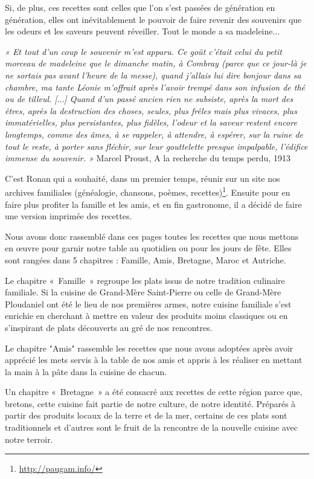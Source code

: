 Si, de plus, ces recettes sont celles que l’on s’est passées de génération en génération, elles ont inévitablement le pouvoir de faire revenir des souvenirs que les odeurs et les saveurs peuvent réveiller. Tout le monde a sa madeleine$\ldots$

\textit{« Et tout d'un coup le souvenir m'est apparu. Ce goût c'était celui du petit morceau de madeleine que le dimanche matin, à Combray (parce que ce jour-là je ne sortais pas avant l'heure de la messe), quand j'allais lui dire bonjour dans sa chambre, ma tante Léonie m'offrait après l'avoir trempé dans son infusion de thé ou de tilleul. [$\ldots$] Quand d'un passé ancien rien ne subsiste, après la mort des êtres, après la destruction des choses, seules, plus frêles mais plus vivaces, plus immatérielles, plus persistantes, plus fidèles, l'odeur et la saveur restent encore longtemps, comme des âmes, à se rappeler, à attendre, à espérer, sur la ruine de tout le reste, à porter sans fléchir, sur leur gouttelette presque impalpable, l'édifice immense du souvenir. »} Marcel Proust, A la recherche du temps perdu, 1913

C’est Ronan qui a souhaité, dans un premier temps, réunir sur un site nos archives familiales (généalogie, chansons, poèmes, recettes)\footnote{\url{http://paugam.info/}}. Ensuite pour en faire plus profiter la famille et les amis, et en fin gastronome, il a décidé de faire une version imprimée des recettes.

Nous avons donc rassemblé dans ces pages toutes les recettes que nous mettons en œuvre pour garnir notre table au quotidien ou pour les jours de fête. Elles sont rangées dans 5 chapitres : Famille, Amis, Bretagne, Maroc et Autriche.

Le chapitre « Famille » regroupe les plats issus de notre tradition culinaire familiale. Si la cuisine de Grand-Mère Saint-Pierre ou celle de Grand-Mère Ploudaniel ont été le lieu de nos premières armes, notre cuisine familiale s’est enrichie en cherchant à mettre en valeur des produits moins classiques ou en s'inspirant de plats découverts au gré de nos rencontres.

Le chapitre "Amis" rassemble les recettes que nous avons adoptées après avoir apprécié les mets servis à la table de nos amis et appris à les réaliser en mettant la main à la pâte dans la cuisine de chacun.

Un chapitre « Bretagne » a été consacré aux recettes de cette région parce que, bretons, cette cuisine fait partie de notre culture, de notre identité. Préparés à partir des produits locaux de la terre et de la mer, certains de ces plats sont traditionnels et d’autres sont le fruit de la rencontre de la nouvelle cuisine avec notre terroir.

